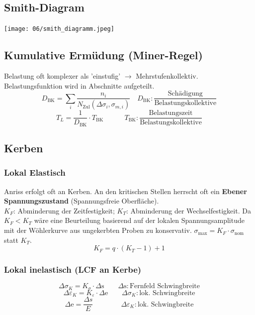     \subsection{Smith-Diagram}
        \texttt{[image: 06/smith\_diagramm.jpeg]}
        \vspace{-4mm}
    \subsection{Kumulative Ermüdung (Miner-Regel)}
        Belastung oft komplexer als 'einstufig' $\rightarrow$ Mehrstufenkollektiv. Belastungsfunktion wird in Abschnitte aufgeteilt.
        \vspace{-2mm}
        \[D_{\textrm{BK}}= \sum_{i}\frac{n_{i}}{N_{\textrm{Zul}}(\Delta\sigma_{i},\sigma_{m,i})} \quad D_{\textrm{BK}}: \frac{\textrm{Schädigung}}{\textrm{Belastungskollektive}} \]
        \vspace{-4mm}
        \[T_{L}=\frac{1}{D_{\textrm{BK}}}\cdot T_{\textrm{BK}} \qquad\quad T_{\textrm{BK}}:\frac{\textrm{Belastungszeit}}{\textrm{Belastungskollektive}}\]
\vspace{-2mm}
    \subsection{Kerben}
        \subsubsection{Lokal Elastisch}
            Anriss erfolgt oft an Kerben. An den kritischen Stellen herrscht oft ein \textbf{Ebener Spannungszustand} (Spannungsfreie Oberfläche).\\ $K_F$: Abminderung der Zeitfestigkeit; $K_T$: Abminderung der Wechselfestigkeit. Da $K_F < K_T$ wäre eine Beurteilung basierend auf der lokalen Spannungsamplitude mit der Wöhlerkurve aus ungekerbten Proben zu konservativ. $\sigma_{\textrm{max}}=K_F \cdot \sigma_{\textrm{nom}}$ statt $K_T$.
            \vspace{-2mm}
            \[K_F = q\cdot(K_T-1)+1\]
\vspace{-4mm}
        \subsubsection{Lokal inelastisch (LCF an Kerbe)}
            \vspace{-1mm}
            \[\Delta\sigma_K = K_{\sigma} \cdot \Delta\textrm{s} \qquad \Delta\textrm{s}:\textrm{Fernfeld Schwingbreite}\]
            \[\Delta\varepsilon_K = K_{\varepsilon} \cdot \Delta\textrm{e} \qquad \Delta\sigma_K:\textrm{lok. Schwingbreite}\]
            \[\Delta\textrm{e}=\frac{\Delta s}{E} \qquad\qquad \Delta\varepsilon_K:\textrm{lok. Schwingbreite}\]
